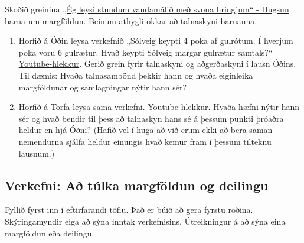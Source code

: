 \documentclass[
  icelandic,
]{book}
\theoremstyle{definition}
\theoremstyle{definition}
\theoremstyle{definition}
\theoremstyle{definition}
\theoremstyle{remark}
\begin{document}
Skoðið greinina \href{https://skolathraedir.is/2021/04/21/eg-leysi-stundum-vandamalid-med-svona-hringjum-hugsun-barna-um-margfoldun/}{„Ég leysi stundum vandamálið með svona hringjum`` - Hugsun barna um margföldun}. Beinum athygli okkar að talnaskyni barnanna.

\begin{enumerate}
\def\labelenumi{\alph{enumi}.}
\item
  Horfið á Óðin leysa verkefnið „Sólveig keypti 4 poka af gulrótum. Í hverjum poka voru 6 gulrætur. Hvað keypti Sólveig margar gulrætur samtals?{}`` \href{https://youtu.be/rqlU-PLoxOs?si=U6lG57jxB6EKkLsn}{Youtube-hlekkur}. Gerið grein fyrir talnaskyni og aðgerðaskyni í lausn Óðins. Til dæmis: Hvaða talnasambönd þekkir hann og hvaða eiginleika margföldunar og samlagningar nýtir hann sér?
\item
  Horfið á Torfa leysa sama verkefni. \href{https://youtu.be/OEZPAQegt9o?si=7VloBBZ5PemM2v_u}{Youtube-hlekkur}. Hvaða hæfni nýtir hann sér og hvað bendir til þess að talnaskyn hans sé á þessum punkti þróaðra heldur en hjá Óðni? (Hafið vel í huga að við erum ekki að bera saman nemendurna sjálfa heldur einungis hvað kemur fram í þessum tilteknu lausnum.)
\end{enumerate}

\subsection{Verkefni: Að túlka margföldun og deilingu}\label{verkefni-tulka-margf-deiling}

Fyllið fyrst inn í eftirfarandi töflu. Það er búið að gera fyrstu röðina. Skýringamyndir eiga að sýna inntak verkefnisins. Útreikningur á að sýna eina margföldun eða deilingu.
\end{document}
